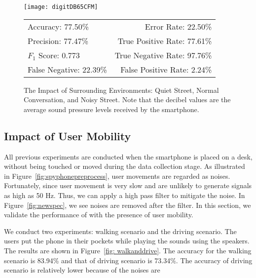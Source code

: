 \begin{landscape}
\begin{figure}[!h]
\begin{minipage}[c]{.33\linewidth}
		\end{minipage}
		\begin{minipage}[c]{.33\linewidth}
			\centering
			\texttt{[image: digitDB65CFM]}
			\tiny
			\begin{tabular}{lr}
				\toprule
				Accuracy: 77.50\% & \hspace{-.00in} Error Rate: 22.50\% \\
				Precision: 77.47\% & \hspace{-.00in} True Positive Rate: 77.61\% \\
				$F_1$ Score: 0.773 & \hspace{-.00in} True Negative Rate: 97.76\% \\
				False Negative: 22.39\%  & \hspace{-.00in} False Positive Rate: 2.24\% \\
				\bottomrule
			\end{tabular}
		\end{minipage}
		\caption[Impact of Surrounding Environments.]{The Impact of Surrounding Environments: Quiet Street, Normal Conversation, and Noisy Street. Note that the decibel values are  the average sound pressure levels received by the smartphone. }
		\label{fig:noisetestresult}
	\end{figure}
\end{landscape}


\subsection{Impact of User Mobility}\label{sec:impact:move}
All previous experiments are conducted when the smartphone is placed on a desk, without being touched or moved during the data collection stage.  As illustrated in Figure~\ref{fig:spyphonepreprocess}, user movements are regarded as noises. Fortunately, since user movement is very slow and are unlikely to generate signals as high as 50 Hz. Thus, we can apply a high pass filter to mitigate the noise. In Figure~\ref{fig:newspec}, we see noises are removed after the filter.  In this section, we validate the performance of {\systemName} with the presence of user mobility. 

We conduct two experiments: walking scenario and the driving scenario. The users put the phone in their pockets while playing the sounds using the speakers. The results are shown in Figure~\ref{fig: walkanddrive}. The accuracy for the walking scenario is 83.94\% and that of driving scenario is 73.34\%. The accuracy of driving scenario is relatively lower because of the noises are 


